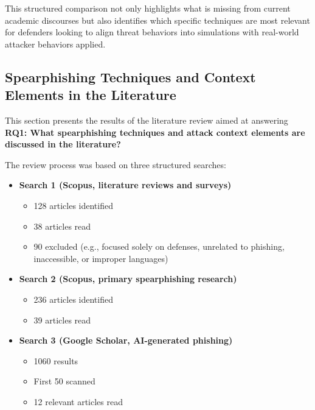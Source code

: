 This structured comparison not only highlights what is missing from current academic discourses but also identifies which specific techniques are most relevant for defenders looking to align threat behaviors into simulations with real-world attacker behaviors applied.

\subsection{Spearphishing Techniques and Context Elements in the Literature}
This section presents the results of the literature review aimed at answering \textbf{RQ1: What spearphishing techniques and attack context elements are discussed in the literature?}

The review process was based on three structured searches:
\begin{itemize}
    \item \textbf{Search 1 (Scopus, literature reviews and surveys)}
    \begin{itemize}
        \item 128 articles identified
        \item 38 articles read
        \item 90 excluded (e.g., focused solely on defenses, unrelated to phishing, inaccessible, or improper languages)
    \end{itemize}
\item \textbf{Search 2 (Scopus, primary spearphishing research)}
\begin{itemize}
    \item 236 articles identified
    \item 39 articles read
\end{itemize}
\item \textbf{Search 3 (Google Scholar, AI-generated phishing)}
\begin{itemize}
    \item 1060 results
    \item First 50 scanned
    \item 12 relevant articles read
\end{itemize}
\end{itemize}

